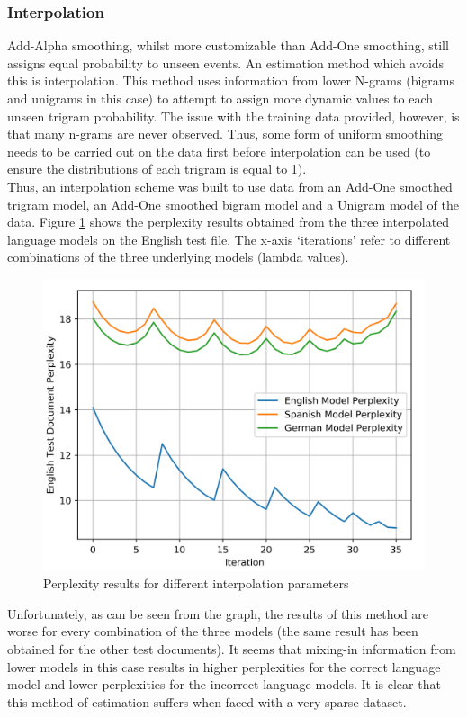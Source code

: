 \documentclass[12pt]{article}
\begin{document}
\subsubsection{Interpolation}
Add-Alpha smoothing, whilst more customizable than Add-One smoothing, still assigns equal probability to unseen events.  An estimation method which avoids this is interpolation.  This method uses information from lower N-grams (bigrams and unigrams in this case) to attempt to assign more dynamic values to each unseen trigram probability.  The issue with the training data provided, however, is that many n-grams are never observed.  Thus, some form of uniform smoothing needs to be carried out on the data first before interpolation can be used (to ensure the distributions of each trigram is equal to 1).\\
\hfill\break
Thus, an interpolation scheme was built to use data from an Add-One smoothed trigram model, an Add-One smoothed bigram model and a Unigram model of the data.  Figure \ref{fig:interpchangesenglish} shows the perplexity results obtained from the three interpolated language models on the English test file.  The x-axis `iterations' refer to different combinations of the three underlying models (lambda values).
\begin{figure}[H]
	\centering
	\includegraphics[width=0.7\linewidth]{graphics/interp_changes_English}
	\caption{Perplexity results for different interpolation parameters}
	\label{fig:interpchangesenglish}
\end{figure}
Unfortunately, as can be seen from the graph, the results of this method are worse for every combination of the three models (the same result has been obtained for the other test documents).  It seems that mixing-in information from lower models in this case results in higher perplexities for the correct language model and lower perplexities for the incorrect language models.  It is clear that this method of estimation suffers when faced with a very sparse dataset.
\end{document}
